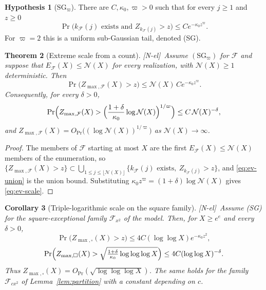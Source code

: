 \documentclass[11pt]{amsart}
\numberwithin{equation}{section}
\theoremstyle{plain}
\newtheorem{theorem}{Theorem}[section]
\newtheorem{corollary}[theorem]{Corollary}
\theoremstyle{definition}
\newtheorem{hypothesis}[theorem]{Hypothesis}
\theoremstyle{remark}
\newcommand{\F}{\mathcal{F}}
\newcommand{\tagNE}{\textup{[N-el]}}
\begin{document}
\begin{hypothesis}[$\mathrm{SG}_\varpi$]
\label{hyp:SG}
There are $C,\kappa_0,\varpi>0$ such that for every $j\ge1$ and $z\ge0$
\[
\Pr\bigl(k_\F(j)\text{ exists and }Z_{k_\F(j)}>z\bigr)\le Ce^{-\kappa_0z^\varpi}.
\]
For $\varpi=2$ this is a uniform sub-Gaussian tail, denoted (SG).
\end{hypothesis}

\begin{theorem}[Extreme scale from a count]
\label{thm:ev-union}
\tagNE\ Assume $(\mathrm{SG}_\varpi)$ for $\F$ and suppose that $E_\F(X)\le \mathcal N(X)$ for
every realization, with $\mathcal N(X)\ge1$ deterministic. Then
\begin{equation}
\label{eq:ev-union}
\Pr\bigl(Z_{\max,\F}(X)>z\bigr)\le \mathcal N(X)\,Ce^{-\kappa_0z^\varpi}.
\end{equation}
Consequently, for every $\delta>0$,
\begin{equation}
\label{eq:ev-scale}
\Pr\Bigl(Z_{\max,\F}(X)>\Bigl(\frac{1+\delta}{\kappa_0}\log \mathcal N(X)\Bigr)^{1/\varpi}\Bigr)
\le C\,\mathcal N(X)^{-\delta},
\end{equation}
and $Z_{\max,\F}(X)=O_{\Pr}\bigl((\log \mathcal N(X))^{1/\varpi}\bigr)$ as $\mathcal N(X)\to\infty$.
\end{theorem}

\begin{proof}
The members of $\F$ starting at most $X$ are the first $E_\F(X)\le \mathcal N(X)$
members of the enumeration, so
$\{Z_{\max,\F}(X)>z\}\subset\bigcup_{1\le j\le\lfloor\mathcal N(X)\rfloor}\{k_\F(j)\text{ exists},\
Z_{k_\F(j)}>z\}$, and \eqref{eq:ev-union} is the union bound. Substituting
$\kappa_0z^\varpi=(1+\delta)\log \mathcal N(X)$ gives \eqref{eq:ev-scale}.
\end{proof}

\begin{corollary}[Triple-logarithmic scale on the square family]
\label{cor:ev-square}
\tagNE\ Assume (SG) for the square-exceptional family $\F_{x^2}$ of the model. Then,
for $X\ge e^e$ and every $\delta>0$,
\begin{equation}
\label{eq:ev-square}
\Pr\bigl(Z_{\max,\square}(X)>z\bigr)\le4C(\log\log X)e^{-\kappa_0z^2},
\end{equation}
\begin{equation}
\label{eq:ev-square-b}
\Pr\Bigl(Z_{\max,\square}(X)>\sqrt{\tfrac{1+\delta}{\kappa_0}\log\log\log X}\Bigr)
\le4C(\log\log X)^{-\delta}.
\end{equation}
Thus $Z_{\max,\square}(X)=O_{\Pr}(\sqrt{\log\log\log X})$. The same holds for
the family $\F_{cx^2}$ of Lemma~\ref{lem:partition} with a constant depending
on $c$.
\end{corollary}
\end{document}
